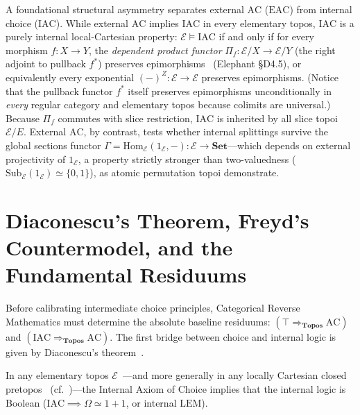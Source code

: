 A foundational structural asymmetry separates external $\mathrm{AC}$ ($\mathrm{EAC}$) from internal choice ($\mathrm{IAC}$). While external $\mathrm{AC}$ implies $\mathrm{IAC}$ in every elementary topos, $\mathrm{IAC}$ is a purely internal local-Cartesian property: $\mathcal{E} \models \mathrm{IAC}$ if and only if for every morphism $f: X \to Y$, the \emph{dependent product functor} $\Pi_f: \mathcal{E}/X \to \mathcal{E}/Y$ (the right adjoint to pullback $f^*$) preserves epimorphisms~\cite{Johnstone02} (Elephant \S D4.5), or equivalently every exponential $(-)^Z : \mathcal{E} \to \mathcal{E}$ preserves epimorphisms. (Notice that the pullback functor $f^*$ itself preserves epimorphisms unconditionally in \emph{every} regular category and elementary topos because colimits are universal.) Because $\Pi_f$ commutes with slice restriction, $\mathrm{IAC}$ is inherited by all slice topoi $\mathcal{E}/E$. External $\mathrm{AC}$, by contrast, tests whether internal splittings survive the global sections functor $\Gamma = \mathrm{Hom}_{\mathcal{E}}(1_{\mathcal{E}}, -): \mathcal{E} \to \mathbf{Set}$---which depends on external projectivity of $1_{\mathcal{E}}$, a property strictly stronger than two-valuedness ($\mathrm{Sub}_{\mathcal{E}}(1_{\mathcal{E}}) \simeq \{0, 1\}$), as atomic permutation topoi demonstrate.

\section{Diaconescu's Theorem, Freyd's Countermodel, and the Fundamental Residuums}

Before calibrating intermediate choice principles, Categorical Reverse Mathematics must determine the absolute baseline residuums: $(\top \Rightarrow_{\mathbf{Topos}} \mathrm{AC})$ and $(\mathrm{IAC} \Rightarrow_{\mathbf{Topos}} \mathrm{AC})$. The first bridge between choice and internal logic is given by Diaconescu's theorem~\cite{Diaconescu75}.

\begin{theorem}\label{thm:diaconescu}%
%

In any elementary topos $\mathcal{E}$~\cite{Diaconescu75}---and more generally in any locally Cartesian closed pretopos~\cite[\S D4.5, Thm.~D4.5.1--Cor.~D4.5.2]{Johnstone02} (cf.~\cite{Maietti05})---the Internal Axiom of Choice implies that the internal logic is Boolean ($\mathrm{IAC} \implies \Omega \simeq 1+1$, or internal $\mathrm{LEM}$).

\end{theorem}

